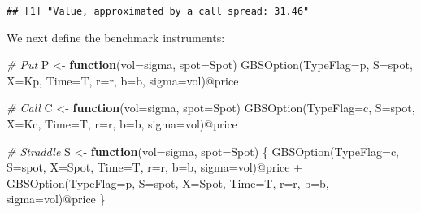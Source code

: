 \documentclass[]{tufte-book}
\newenvironment{Shaded}{}{}
\newcommand{\AttributeTok}[1]{\textcolor[rgb]{0.49,0.56,0.16}{#1}}
\newcommand{\CommentTok}[1]{\textcolor[rgb]{0.38,0.63,0.69}{\textit{#1}}}
\newcommand{\ControlFlowTok}[1]{\textcolor[rgb]{0.00,0.44,0.13}{\textbf{#1}}}
\newcommand{\FunctionTok}[1]{\textcolor[rgb]{0.02,0.16,0.49}{#1}}
\newcommand{\NormalTok}[1]{#1}
\newcommand{\OtherTok}[1]{\textcolor[rgb]{0.00,0.44,0.13}{#1}}
\newcommand{\SpecialCharTok}[1]{\textcolor[rgb]{0.25,0.44,0.63}{#1}}
\newcommand{\StringTok}[1]{\textcolor[rgb]{0.25,0.44,0.63}{#1}}
\begin{document}
\begin{verbatim}
## [1] "Value, approximated by a call spread: 31.46"
\end{verbatim}

We next define the benchmark instruments:

\begin{Shaded}
\begin{Highlighting}[]
  \CommentTok{\# Put}
\NormalTok{  P }\OtherTok{\textless{}{-}} \ControlFlowTok{function}\NormalTok{(}\AttributeTok{vol=}\NormalTok{sigma, }\AttributeTok{spot=}\NormalTok{Spot) }\FunctionTok{GBSOption}\NormalTok{(}\AttributeTok{TypeFlag=}\StringTok{\textquotesingle{}p\textquotesingle{}}\NormalTok{, }\AttributeTok{S=}\NormalTok{spot, }\AttributeTok{X=}\NormalTok{Kp,}
                             \AttributeTok{Time=}\NormalTok{T, }\AttributeTok{r=}\NormalTok{r, }\AttributeTok{b=}\NormalTok{b, }\AttributeTok{sigma=}\NormalTok{vol)}\SpecialCharTok{@}\NormalTok{price}

  \CommentTok{\# Call}
\NormalTok{  C }\OtherTok{\textless{}{-}} \ControlFlowTok{function}\NormalTok{(}\AttributeTok{vol=}\NormalTok{sigma, }\AttributeTok{spot=}\NormalTok{Spot) }\FunctionTok{GBSOption}\NormalTok{(}\AttributeTok{TypeFlag=}\StringTok{\textquotesingle{}c\textquotesingle{}}\NormalTok{, }\AttributeTok{S=}\NormalTok{spot, }\AttributeTok{X=}\NormalTok{Kc,}
                             \AttributeTok{Time=}\NormalTok{T, }\AttributeTok{r=}\NormalTok{r, }\AttributeTok{b=}\NormalTok{b, }\AttributeTok{sigma=}\NormalTok{vol)}\SpecialCharTok{@}\NormalTok{price}

  \CommentTok{\# Straddle}
\NormalTok{  S }\OtherTok{\textless{}{-}} \ControlFlowTok{function}\NormalTok{(}\AttributeTok{vol=}\NormalTok{sigma, }\AttributeTok{spot=}\NormalTok{Spot) \{}
    \FunctionTok{GBSOption}\NormalTok{(}\AttributeTok{TypeFlag=}\StringTok{\textquotesingle{}c\textquotesingle{}}\NormalTok{, }\AttributeTok{S=}\NormalTok{spot, }\AttributeTok{X=}\NormalTok{Spot, }\AttributeTok{Time=}\NormalTok{T, }\AttributeTok{r=}\NormalTok{r, }\AttributeTok{b=}\NormalTok{b, }\AttributeTok{sigma=}\NormalTok{vol)}\SpecialCharTok{@}\NormalTok{price }\SpecialCharTok{+}
    \FunctionTok{GBSOption}\NormalTok{(}\AttributeTok{TypeFlag=}\StringTok{\textquotesingle{}p\textquotesingle{}}\NormalTok{, }\AttributeTok{S=}\NormalTok{spot, }\AttributeTok{X=}\NormalTok{Spot, }\AttributeTok{Time=}\NormalTok{T, }\AttributeTok{r=}\NormalTok{r, }\AttributeTok{b=}\NormalTok{b, }\AttributeTok{sigma=}\NormalTok{vol)}\SpecialCharTok{@}\NormalTok{price}
\NormalTok{  \}}


\end{Highlighting}
\end{Shaded}
\end{document}
